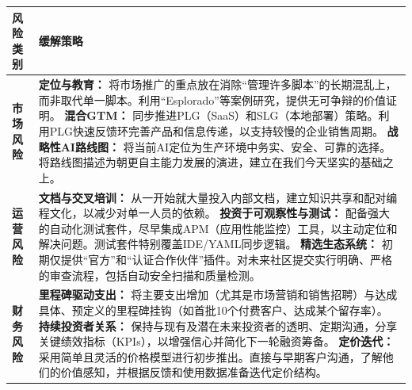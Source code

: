 \documentclass[11点, A4纸, 单面]{article}
\begin{document}
\begin{table}[H]
\centering
\begin{tabularx}{\textwidth}{@{}lL@{}}
\toprule
\textbf{风险类别} & \textbf{缓解策略} \\
\midrule
\textbf{市场风险} & 
\textbf{定位与教育：} 将市场推广的重点放在消除“管理许多脚本”的长期混乱上，而非取代单一脚本。利用“Esplorado”等案例研究，提供无可争辩的价值证明。 \newline\newline
\textbf{混合GTM：} 同步推进PLG（SaaS）和SLG（本地部署）策略。利用PLG快速反馈环完善产品和信息传递，以支持较慢的企业销售周期。 \newline\newline
\textbf{战略性AI路线图：} 将当前AI定位为生产环境中务实、安全、可靠的选择。将路线图描述为朝更自主能力发展的演进，建立在我们今天坚实的基础之上。 \\
\addlinespace
\textbf{运营风险} & 
\textbf{文档与交叉培训：} 从一开始就大量投入内部文档，建立知识共享和配对编程文化，以减少对单一人员的依赖。 \newline\newline
\textbf{投资于可观察性与测试：} 配备强大的自动化测试套件，尽早集成APM（应用性能监控）工具，以主动定位和解决问题。测试套件特别覆盖IDE/YAML同步逻辑。 \newline\newline
\textbf{精选生态系统：} 初期仅提供“官方”和“认证合作伙伴”插件。对未来社区提交实行明确、严格的审查流程，包括自动安全扫描和质量检测。 \\
\addlinespace
\textbf{财务风险} & 
\textbf{里程碑驱动支出：} 将主要支出增加（尤其是市场营销和销售招聘）与达成具体、预定义的里程碑挂钩（如首批10个付费客户、达成某个留存率）。 \newline\newline
\textbf{持续投资者关系：} 保持与现有及潜在未来投资者的透明、定期沟通，分享关键绩效指标（KPIs），以增强信心并简化下一轮融资筹备。 \newline\newline
\textbf{定价迭代：} 采用简单且灵活的价格模型进行初步推出。直接与早期客户沟通，了解他们的价值感知，并根据反馈和使用数据准备迭代定价结构。 \\
\bottomrule
\end{tabularx}
\end{table}

\end{document}
